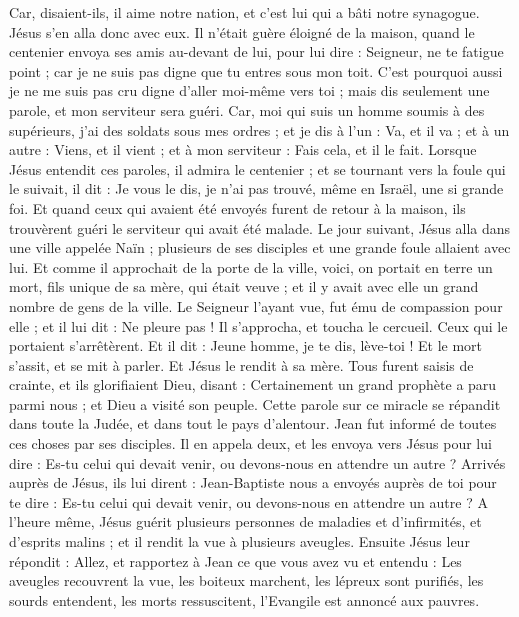 \begin{multicols}{2}
Car, disaient-ils, il aime notre nation, et c’est lui qui a bâti notre synagogue.
Jésus s'en alla donc avec eux. Il n’était guère éloigné de la maison, quand le centenier envoya ses amis au-devant de lui, pour lui dire : Seigneur, ne te fatigue point ; car je ne suis pas digne que tu entres sous mon toit.
C'est pourquoi aussi je ne me suis pas cru digne d'aller moi-même vers toi ; mais dis seulement une parole, et mon serviteur sera guéri.
Car, moi qui suis un homme soumis à des supérieurs, j'ai des soldats sous mes ordres ; et je dis à l'un : Va, et il va ; et à un autre : Viens, et il vient ; et à mon serviteur : Fais cela, et il le fait.
Lorsque Jésus entendit ces paroles, il admira le centenier ; et se tournant vers la foule qui le suivait, il dit : Je vous le dis, je n'ai pas trouvé, même en Israël, une si grande foi.
Et quand ceux qui avaient été envoyés furent de retour à la maison, ils trouvèrent guéri le serviteur qui avait été malade.
Le jour suivant, Jésus alla dans une ville appelée Naïn ; plusieurs de ses disciples et une grande foule allaient avec lui.
Et comme il approchait de la porte de la ville, voici, on portait en terre un mort, fils unique de sa mère, qui était veuve ; et il y avait avec elle un grand nombre de gens de la ville.
Le Seigneur l’ayant vue, fut ému de compassion pour elle ; et il lui dit : Ne pleure pas !
Il s’approcha, et toucha le cercueil. Ceux qui le portaient s'arrêtèrent. Et il dit : Jeune homme, je te dis, lève-toi !
Et le mort s’assit, et se mit à parler. Et Jésus le rendit à sa mère.
Tous furent saisis de crainte, et ils glorifiaient Dieu, disant : Certainement un grand prophète a paru parmi nous ; et Dieu a visité son peuple.
Cette parole sur ce miracle se répandit dans toute la Judée, et dans tout le pays d’alentour.
Jean fut informé de toutes ces choses par ses disciples.
Il en appela deux, et les envoya vers Jésus pour lui dire : Es-tu celui qui devait venir, ou devons-nous en attendre un autre ?
Arrivés auprès de Jésus, ils lui dirent : Jean-Baptiste nous a envoyés auprès de toi pour te dire : Es-tu celui qui devait venir, ou devons-nous en attendre un autre ?
A l’heure même, Jésus guérit plusieurs personnes de maladies et d’infirmités, et d’esprits malins ; et il rendit la vue à plusieurs aveugles.
Ensuite Jésus leur répondit : Allez, et rapportez à Jean ce que vous avez vu et entendu : Les aveugles recouvrent la vue, les boiteux marchent, les lépreux sont purifiés, les sourds entendent, les morts ressuscitent, l'Evangile est annoncé aux pauvres.

\end{multicols}
